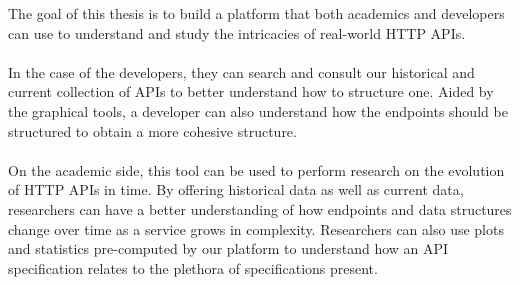 The goal of this thesis is to build a platform that both academics and developers can use to understand and study the intricacies of real-world HTTP APIs. \\ \\
In the case of the developers, they can search and consult our historical and current collection of APIs to better understand how to structure one.
Aided by the graphical tools, a developer can also understand how the endpoints should be structured to obtain a more cohesive structure. \\ \\
On the academic side, this tool can be used to perform research on the evolution of HTTP APIs in time.
By offering historical data as well as current data, researchers can have a better understanding of how endpoints and data structures change over time as a service grows in complexity.
Researchers can also use plots and statistics pre-computed by our platform to understand how an API specification relates to the plethora of specifications present.